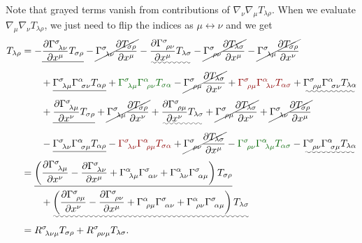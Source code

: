 \documentclass[a4paper,pdftex,10pt]{article}
\begin{document}
Note that grayed terms vanish from contributions of $\nabla_{\nu}\nabla_{\mu}T_{\lambda\rho}$. When we evaluate $\nabla_{\mu}\nabla_{\nu}T_{\lambda\rho}$, we just need to flip the indices as $\mu\leftrightarrow\nu$ and we get 
\begin{align}
  [\nabla_{\mu},\nabla_{\nu}]T_{\lambda\rho}
  &=
  -
  \uline{
  \pdv{\Gamma^{\sigma}_{\ \lambda\nu}}{x^{\mu}}T_{\sigma\rho}
  }
  -
  \cancel{
  \Gamma^{\sigma}_{\ \lambda\nu}\pdv{T_{\sigma\rho}}{x^{\mu}}
  }
  -
  \uwave{
  \pdv{\Gamma^{\sigma}_{\ \rho\nu}}{x^{\mu}}T_{\lambda\sigma}
  }
  -
  \cancel{
  \Gamma^{\sigma}_{\ \rho\nu}\pdv{T_{\lambda\sigma}}{x^{\mu}}
  }
  -
  \cancel{
  \Gamma^{\sigma}_{\ \lambda\mu}\pdv{T_{\sigma\rho}}{x^{\nu}}
  }
  \nonumber
  \\
  &\qquad
  +
  \uline{
  \Gamma^{\sigma}_{\ \lambda\mu}\Gamma^{\alpha}_{\ \sigma\nu}T_{\alpha\rho}
  }
  +
  \textcolor{DarkGreen}{
  \Gamma^{\sigma}_{\ \lambda\mu}\Gamma^{\alpha}_{\ \rho\nu}T_{\sigma\alpha}
  }
  -
  \cancel{
  \Gamma^{\sigma}_{\ \rho\mu}\pdv{T_{\lambda\sigma}}{x^{\nu}}
  }
  +
  \textcolor{DarkRed}{
  \Gamma^{\sigma}_{\ \rho\mu}\Gamma^{\alpha}_{\ \lambda\nu}T_{\alpha\sigma}
  }
  +
  \uwave{
  \Gamma^{\sigma}_{\ \rho\mu}\Gamma^{\alpha}_{\ \sigma\nu}T_{\lambda\alpha}
  }
  \nonumber
  \\
  &\qquad
  +
  \uline{
  \pdv{\Gamma^{\sigma}_{\ \lambda\mu}}{x^{\nu}}T_{\sigma\rho}
  }
  +
  \cancel{
  \Gamma^{\sigma}_{\ \lambda\mu}\pdv{T_{\sigma\rho}}{x^{\nu}}
  }
  +
  \uwave{
  \pdv{\Gamma^{\sigma}_{\ \rho\mu}}{x^{\nu}}T_{\lambda\sigma}
  }
  +
  \cancel{
  \Gamma^{\sigma}_{\ \rho\mu}\pdv{T_{\lambda\sigma}}{x^{\nu}}
  }
  +
  \cancel{
  \Gamma^{\sigma}_{\ \lambda\nu}\pdv{T_{\sigma\rho}}{x^{\mu}}
  }
  \nonumber
  \\
  &\qquad
  -
  \uline{
  \Gamma^{\sigma}_{\ \lambda\nu}\Gamma^{\alpha}_{\ \sigma\mu}T_{\alpha\rho}
  }
  -
  \textcolor{DarkRed}{
  \Gamma^{\sigma}_{\ \lambda\nu}\Gamma^{\alpha}_{\ \rho\mu}T_{\sigma\alpha}
  }
  +
  \cancel{
  \Gamma^{\sigma}_{\ \rho\nu}\pdv{T_{\lambda\sigma}}{x^{\mu}}
  }
  -
  \textcolor{DarkGreen}{
  \Gamma^{\sigma}_{\ \rho\nu}\Gamma^{\alpha}_{\ \lambda\mu}T_{\alpha\sigma}
  }
  -
  \uwave{
  \Gamma^{\sigma}_{\ \rho\nu}\Gamma^{\alpha}_{\ \sigma\mu}T_{\lambda\alpha}
  }
  \nonumber
  \\
  &=
  \uline{
    \left(  
      \pdv{\Gamma^{\sigma}_{\ \lambda\mu}}{x^{\nu}}
      -
      \pdv{\Gamma^{\sigma}_{\ \lambda\nu}}{x^{\mu}}
      +
      \Gamma^{\alpha}_{\ \lambda\mu}\Gamma^{\sigma}_{\ \alpha\nu}
      +
      \Gamma^{\alpha}_{\ \lambda\nu}\Gamma^{\sigma}_{\ \alpha\mu}
    \right)
    T_{\sigma\rho}
  }
  \nonumber
  \\
  &\qquad
  +
  \uwave{
    \left(
      \pdv{\Gamma^{\sigma}_{\ \rho\mu}}{x^{\nu}}
      -
      \pdv{\Gamma^{\sigma}_{\ \rho\nu}}{x^{\mu}}
      +
      \Gamma^{\alpha}_{\ \rho\mu}\Gamma^{\sigma}_{\ \alpha\nu}
      +
      \Gamma^{\alpha}_{\ \rho\nu}\Gamma^{\sigma}_{\ \alpha\mu}
    \right)
    T_{\lambda\sigma}
  }
  \nonumber
  \\
  &=R^{\sigma}_{\ \lambda\nu\mu}T_{\sigma\rho}+R^{\sigma}_{\ \rho\nu\mu}T_{\lambda\sigma}
  .
\end{align}
\end{document}

